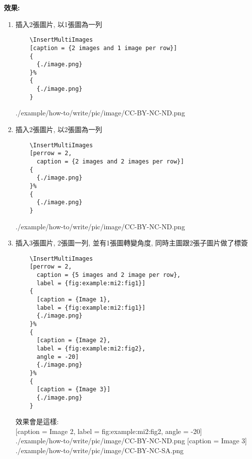   \newpage

  {\bf 效果:}
  \begin{enumerate}
  \item
  {
    插入2張圖片, 以1張圖為一列
    \begin{verbatim}
    \InsertMultiImages
    [caption = {2 images and 1 image per row}]
    {
      {./image.png}
    }%
    {
      {./image.png}
    }
    \end{verbatim}
    {
      {./example/how-to/write/pic/image/CC-BY-NC-ND.png}
    }
  } %

  \item
  {
    插入2張圖片, 以2張圖為一列
    \begin{verbatim}
    \InsertMultiImages
    [perrow = 2,
      caption = {2 images and 2 images per row}]
    {
      {./image.png}
    }%
    {
      {./image.png}
    }
    \end{verbatim}
    {
      {./example/how-to/write/pic/image/CC-BY-NC-ND.png}
    }
  } %

  \newpage
  \item
  {
    插入3張圖片, 2張圖一列, 並有1張圖轉變角度, 同時主圖跟2張子圖片做了標簽
    \begin{verbatim}
    \InsertMultiImages
    [perrow = 2,
      caption = {5 images and 2 image per row},
      label = {fig:example:mi2:fig1}]
    {
      [caption = {Image 1},
      label = {fig:example:mi2:fig1}]
      {./image.png}
    }%
    {
      [caption = {Image 2},
      label = {fig:example:mi2:fig2},
      angle = -20]
      {./image.png}
    }%
    {
      [caption = {Image 3}]
      {./image.png}
    }
    \end{verbatim}

    效果會是這樣: \\
    {
      [caption = {Image 2},
      label = {fig:example:mi2:fig2},
      angle = -20]
      {./example/how-to/write/pic/image/CC-BY-NC-ND.png}
    }%
    {
      [caption = {Image 3}]
      {./example/how-to/write/pic/image/CC-BY-NC-SA.png}
    }

}
\end{enumerate}
